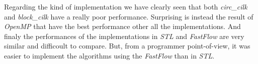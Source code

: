 \documentclass{article}
\begin{document}
\medskip

Regarding the kind of implementation we have clearly seen that both \textit{circ\_cilk} and \textit{block\_cilk} have a really poor performance. Surprising is instead the result of \textit{OpenMP} that have the best performance other all the implementations. And finaly the performances of the implementations in \textit{STL} and \textit{FastFlow} are very similar and difficoult to compare. But, from a programmer point-of-view, it was easier to implement the algorithms using the \textit{FastFlow} than in \textit{STL}.


\end{document}

